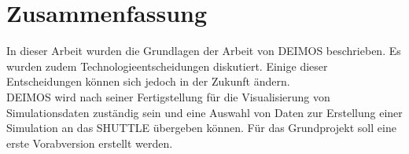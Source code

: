 \documentclass[10pt,conference,compsocconf]{IEEEtran}
\begin{document}
\section{Zusammenfassung}
In dieser Arbeit wurden die Grundlagen der Arbeit von DEIMOS beschrieben. Es wurden zudem Technologieentscheidungen diskutiert. Einige dieser Entscheidungen können sich jedoch in der Zukunft ändern.\\
DEIMOS wird nach seiner Fertigstellung für die Visualisierung von Simulationsdaten zuständig sein und eine Auswahl von Daten zur Erstellung einer Simulation an das SHUTTLE übergeben können. Für das Grundprojekt soll eine erste Vorabversion erstellt werden.



\end{document}
